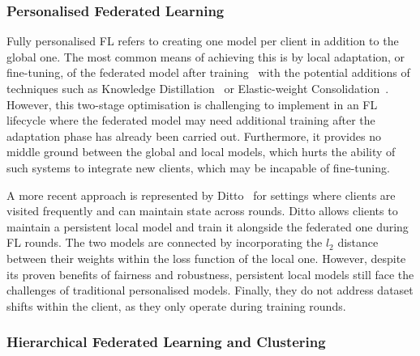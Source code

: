 \subsubsection{Personalised Federated Learning}

Fully personalised FL refers to creating one model per client in addition to the global one. The most common means of achieving this is by local adaptation, or fine-tuning, of the federated model after training~\citep{SalvagingFL} with the potential additions of techniques such as Knowledge Distillation~\citep{DeepMutualLearning} or Elastic-weight Consolidation~\citep{kirkpatrick2017overcoming}. However, this two-stage optimisation is challenging to implement in an FL lifecycle where the federated model may need additional training after the adaptation phase has already been carried out. Furthermore, it provides no middle ground between the global and local models, which hurts the ability of such systems to integrate new clients, which may be incapable of fine-tuning.


A more recent approach is represented by Ditto~\citep{Ditto} for settings where clients are visited frequently and can maintain state across rounds. Ditto allows clients to maintain a persistent local model and train it alongside the federated one during FL rounds. The two models are connected by incorporating the $l_2$ distance between their weights within the loss function of the local one. However, despite its proven benefits of fairness and robustness, persistent local models still face the challenges of traditional personalised models. Finally, they do not address dataset shifts within the client, as they only operate during training rounds.



\subsubsection{Hierarchical Federated Learning and Clustering}

